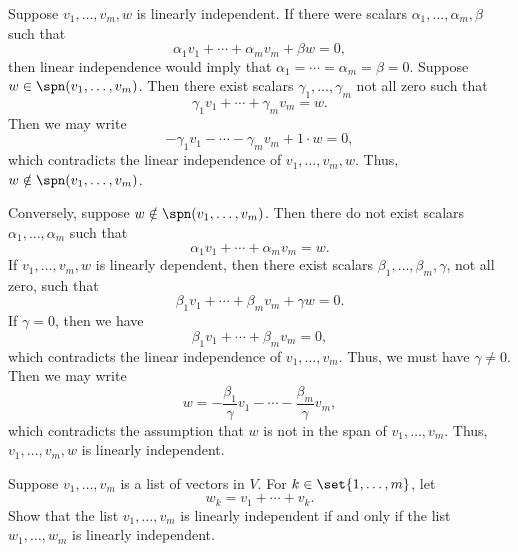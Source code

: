 \begin{sol}
    Suppose $v_1, \ldots, v_m, w$ is linearly independent. If there were scalars $\alpha_1, \ldots, \alpha_m, \beta$ such that
    \[\alpha_1 v_1 + \cdots + \alpha_m v_m + \beta w = 0,\]
    then linear independence would imply that $\alpha_1 = \cdots = \alpha_m = \beta = 0$. Suppose $w \in \spn(v_1, \ldots, v_m)$. Then there exist scalars $\gamma_1, \ldots, \gamma_m$ not all zero such that
    \[\gamma_1 v_1 + \cdots + \gamma_m v_m = w.\]
    Then we may write
    \[-\gamma_1 v_1 - \cdots - \gamma_m v_m + 1\cdot w = 0,\]
    which contradicts the linear independence of $v_1, \ldots, v_m, w$. Thus, $w \notin \spn(v_1, \ldots, v_m)$.

    Conversely, suppose $w \notin \spn(v_1, \ldots, v_m)$. Then there do not exist scalars $\alpha_1, \ldots, \alpha_m$ such that
    \[\alpha_1 v_1 + \cdots + \alpha_m v_m = w.\]
    If $v_1, \ldots, v_m, w$ is linearly dependent, then there exist scalars $\beta_1, \ldots, \beta_m, \gamma$, not all zero, such that
    \[\beta_1 v_1 + \cdots + \beta_m v_m + \gamma w = 0.\]
    If $\gamma = 0$, then we have
    \[\beta_1 v_1 + \cdots + \beta_m v_m = 0,\]
    which contradicts the linear independence of $v_1, \ldots, v_m$. Thus, we must have $\gamma \neq 0$. Then we may write
    \[w = -\frac{\beta_1}{\gamma}v_1 - \cdots -\frac{\beta_m}{\gamma}v_m,\]
    which contradicts the assumption that $w$ is not in the span of $v_1, \ldots, v_m$. Thus, $v_1, \ldots, v_m, w$ is linearly independent.
\end{sol}
 
\begin{exercise}[2a14]
    Suppose $v_1, \ldots, v_m$ is a list of vectors in $V$. For $k \in \set{1, \ldots, m}$, let
    \[w_k = v_1 + \cdots + v_k.\]
    Show that the list $v_1, \ldots, v_m$ is linearly independent if and only if the list $w_1, \ldots, w_m$ is linearly independent.
\end{exercise}

